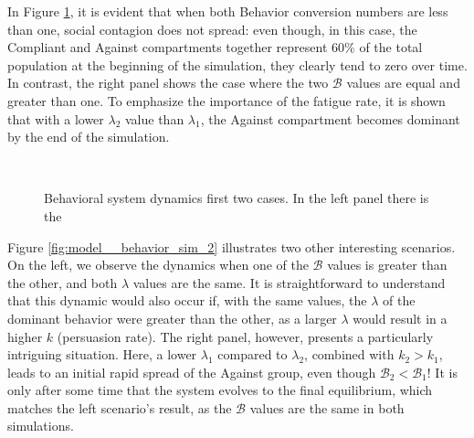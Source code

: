 In Figure \ref{fig:model__behavior_sim_1}, it is evident that when both Behavior conversion numbers are less than one, social contagion does not spread: even though, in this case, the Compliant and Against compartments together represent $60\%$ of the total population at the beginning of the simulation, they clearly tend to zero over time. In contrast, the right panel shows the case where the two $\mathcal{B}$ values are equal and greater than one. To emphasize the importance of the fatigue rate, it is shown that with a lower $\lambda_2$ value than $\lambda_1$, the Against compartment becomes dominant by the end of the simulation. 
\begin{figure}[ht]
	\centering
	 \quad
	 \\
	\caption[Behavioural model simulation first]{Behavioral system dynamics first two cases. In the left panel there is the }
	\label{fig:model__behavior_sim_1}
\end{figure}
\label{subsec:model_behav}

Figure \ref{fig:model__behavior_sim_2} illustrates two other interesting scenarios. On the left, we observe the dynamics when one of the $\mathcal{B}$ values is greater than the other, and both $\lambda$ values are the same. It is straightforward to understand that this dynamic would also occur if, with the same values, the $\lambda$ of the dominant behavior were greater than the other, as a larger $\lambda$ would result in a higher $k$ (persuasion rate). The right panel, however, presents a particularly intriguing situation. Here, a lower $\lambda_1$ compared to $\lambda_2$, combined with $k_2 > k_1$, leads to an initial rapid spread of the Against group, even though $\mathcal{B}_2 < \mathcal{B}_1$! It is only after some time that the system evolves to the final equilibrium, which matches the left scenario's result, as the $\mathcal{B}$ values are the same in both simulations.

